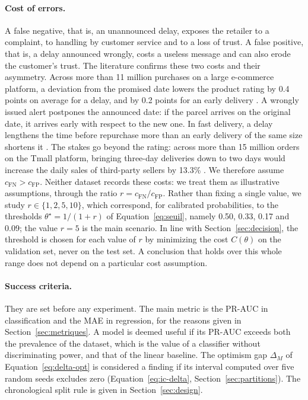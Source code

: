 \documentclass[11pt,a4paper]{article}
\theoremstyle{definition}
\begin{document}
\paragraph{Cost of errors.} A false negative, that is, an unannounced delay, exposes the retailer to a complaint, to handling by customer service and to a loss of trust. A false positive, that is, a delay announced wrongly, costs a useless message and can also erode the customer's trust. The literature confirms these two costs and their asymmetry. Across more than 11 million purchases on a large e-commerce platform, a deviation from the promised date lowers the product rating by 0.4 points on average for a delay, and by 0.2 points for an early delivery \cite{nozari2026please}. A wrongly issued alert postpones the announced date: if the parcel arrives on the original date, it arrives early with respect to the new one. In fast delivery, a delay lengthens the time before repurchase more than an early delivery of the same size shortens it \cite{harter2025effect}. The stakes go beyond the rating: across more than 15 million orders on the Tmall platform, bringing three-day deliveries down to two days would increase the daily sales of third-party sellers by 13.3\% \cite{deshpande2023logistics}. We therefore assume $c_{\mathrm{FN}} > c_{\mathrm{FP}}$. Neither dataset records these costs: we treat them as illustrative assumptions, through the ratio $r = c_{\mathrm{FN}}/c_{\mathrm{FP}}$. Rather than fixing a single value, we study $r \in \{1, 2, 5, 10\}$, which correspond, for calibrated probabilities, to the thresholds $\theta^\star = 1/(1+r)$ of Equation~\eqref{eq:seuil}, namely 0.50, 0.33, 0.17 and 0.09; the value $r = 5$ is the main scenario. In line with Section~\ref{sec:decision}, the threshold is chosen for each value of $r$ by minimizing the cost $C(\theta)$ on the validation set, never on the test set. A conclusion that holds over this whole range does not depend on a particular cost assumption.

\paragraph{Success criteria.} They are set before any experiment. The main metric is the PR-AUC in classification and the MAE in regression, for the reasons given in Section~\ref{sec:metriques}. A model is deemed useful if its PR-AUC exceeds both the prevalence of the dataset, which is the value of a classifier without discriminating power, and that of the linear baseline. The optimism gap $\Delta_M$ of Equation~\eqref{eq:delta-opt} is considered a finding if its interval computed over five random seeds excludes zero (Equation~\eqref{eq:ic-delta}, Section~\ref{sec:partitions}). The chronological split rule is given in Section~\ref{sec:design}.
\end{document}
